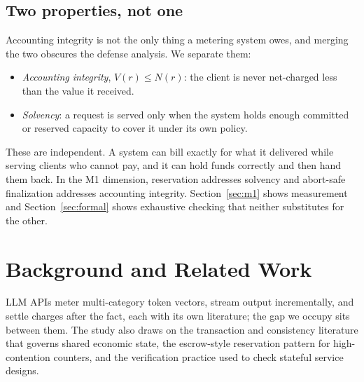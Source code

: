 \documentclass[manuscript,review]{acmart}
\begin{document}
\subsection{Two properties, not one}
Accounting integrity is not the only thing a metering system owes, and merging the two
obscures the defense analysis. We separate them:
\begin{itemize}
\item \textit{Accounting integrity}, $V(r) \le N(r)$: the client is never net-charged
less than the value it received.
\item \textit{Solvency}: a request is served only when the system holds enough committed
or reserved capacity to cover it under its own policy.
\end{itemize}
These are independent. A system can bill exactly for what it delivered while serving
clients who cannot pay, and it can hold funds correctly and then hand them back. In the
M1 dimension, reservation addresses solvency and abort-safe finalization addresses
accounting integrity. Section~\ref{sec:m1} shows measurement and Section~\ref{sec:formal}
shows exhaustive checking that neither substitutes for the other.

\section{Background and Related Work}
\label{sec:related}
LLM APIs meter multi-category token vectors, stream output incrementally, and settle
charges after the fact, each with its own literature; the gap we occupy sits between
them. The study also draws on the transaction and consistency literature that governs
shared economic state, the escrow-style reservation pattern for high-contention counters,
and the verification practice used to check stateful service designs.
\end{document}
